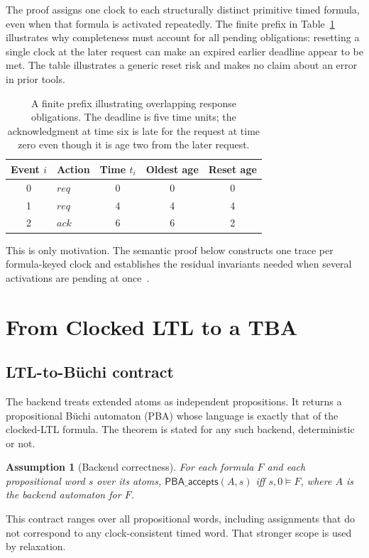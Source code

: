 \documentclass{ieeeaccess}
\newtheorem{assumption}[theorem]{Assumption}
\begin{document}
The proof assigns one clock to each structurally distinct primitive timed
formula, even when that formula is activated repeatedly. The finite prefix in
Table~\ref{tab:overlap-example} illustrates why completeness must account for
all pending obligations: resetting a single clock at the later request can
make an expired earlier deadline appear to be met. The table illustrates a
generic reset risk and makes no claim about an error in prior tools.
\begin{table}[t]
\centering
\caption{A finite prefix illustrating overlapping response obligations.
The deadline is five time units; the acknowledgment at time six is late for
the request at time zero even though it is age two from the later request.}
\label{tab:overlap-example}
\begin{tabular}{@{}clccc@{}}
\toprule
Event $i$ & Action & Time $t_i$ & Oldest age & Reset age\\
\midrule
0 & $\mathit{req}$ & 0 & 0 & 0\\
1 & $\mathit{req}$ & 4 & 4 & 4\\
2 & $\mathit{ack}$ & 6 & 6 & 2\\
\bottomrule
\end{tabular}
\end{table}
This is only motivation. The semantic proof below constructs one trace per
formula-keyed clock and establishes the residual invariants needed when
several activations are pending at once~\cite{openai_codex}.

\section{From Clocked LTL to a TBA}
\label{sec:tba-construction}
\subsection{LTL-to-B\"uchi contract}
The backend treats extended atoms as independent propositions. It returns a
propositional B\"uchi automaton (PBA) whose language is exactly that of the
clocked-LTL formula. The theorem is stated for any such backend, deterministic
or not.
\begin{assumption}[Backend correctness]
\label{ass:backend}
For each formula $F$ and each propositional word $s$ over its atoms,
$\mathsf{PBA\_accepts}(A,s)$ iff $s,0\models F$, where $A$ is the backend
automaton for $F$.
\end{assumption}
This contract ranges over all propositional words, including assignments
that do not correspond to any clock-consistent timed word. That stronger
scope is used by relaxation.
\end{document}
